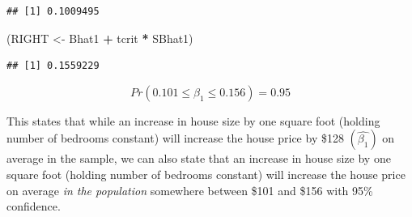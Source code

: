 \documentclass[
]{book}
\newenvironment{Shaded}{\begin{snugshade}}{\end{snugshade}}
\newcommand{\AttributeTok}[1]{\textcolor[rgb]{0.13,0.29,0.53}{#1}}
\newcommand{\CommentTok}[1]{\textcolor[rgb]{0.56,0.35,0.01}{\textit{#1}}}
\newcommand{\ConstantTok}[1]{\textcolor[rgb]{0.56,0.35,0.01}{#1}}
\newcommand{\DecValTok}[1]{\textcolor[rgb]{0.00,0.00,0.81}{#1}}
\newcommand{\FloatTok}[1]{\textcolor[rgb]{0.00,0.00,0.81}{#1}}
\newcommand{\FunctionTok}[1]{\textcolor[rgb]{0.13,0.29,0.53}{\textbf{#1}}}
\newcommand{\NormalTok}[1]{#1}
\newcommand{\OtherTok}[1]{\textcolor[rgb]{0.56,0.35,0.01}{#1}}
\newcommand{\SpecialCharTok}[1]{\textcolor[rgb]{0.81,0.36,0.00}{\textbf{#1}}}
\begin{document}
\begin{Shaded}
\end{Shaded}

\begin{verbatim}
## [1] 0.1009495
\end{verbatim}

\begin{Shaded}
\begin{Highlighting}[]
\NormalTok{(RIGHT }\OtherTok{\textless{}{-}}\NormalTok{ Bhat1 }\SpecialCharTok{+}\NormalTok{ tcrit }\SpecialCharTok{*}\NormalTok{ SBhat1)}
\end{Highlighting}
\end{Shaded}

\begin{verbatim}
## [1] 0.1559229
\end{verbatim}

\[Pr(0.101 \leq \beta_1 \leq 0.156)=0.95\]

This states that while an increase in house size by one square foot (holding number of bedrooms constant) will increase the house price by \$128 \((\hat{\beta_1})\) on average in the sample, we can also state that an increase in house size by one square foot (holding number of bedrooms constant) will increase the house price on average \emph{in the population} somewhere between \$101 and \$156 with 95\% confidence.
\end{document}
